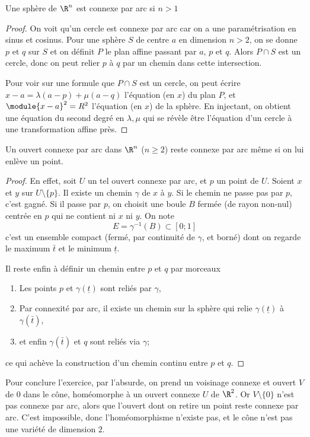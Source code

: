  \begin{lem}Une sphère de $\R^n$ est connexe par arc si $n >
   1$\end{lem}
 \begin{proof}On voit qu'un cercle est connexe par arc car on a une
   paramétrisation en sinus et cosinus. Pour une sphère $S$ de centre
   $a$ en dimension $n > 2$, on se donne $p$ et $q$ sur $S$ et on
   définit $P$ le plan affine passant par $a$, $p$ et $q$. Alors $P
   \cap S$ est un cercle, donc on peut relier $p$ à $q$ par un chemin
   dans cette intersection.

   Pour voir sur une formule que $P \cap S$ est un cercle, on peut
   écrire $x - a = \lambda(a-p) + \mu(a-q)$ l'équation (en $x$) du
   plan $P$, et $\module{x-a}^2 = R^2$ l'équation (en $x$) de la
   sphère. En injectant, on obtient une équation du second degré en
   $\lambda,\mu$ qui se révèle être l'équation d'un cercle à une
   transformation affine près.
 \end{proof}

 \begin{lem}Un ouvert connexe par arc dans $\R^n$ ($n \geq 2$) reste
   connexe par arc même si on lui enlève un point.\end{lem}
 \begin{proof}
   En effet, soit $U$ un tel ouvert connexe par arc, et $p$ un point
   de $U$. Soient $x$ et $y$ sur $U\setminus\{p\}$. Il existe un
   chemin $\gamma$ de $x$ à $y$. Si le chemin ne passe pas par $p$,
   c'est gagné. Si il passe par $p$, on choisit une boule $B$ fermée
   (de rayon non-nul) centrée en $p$ qui ne contient ni $x$ ni
   $y$. On note
   \[E = \gamma^{-1}(B) \subset [0;1]\] c'est un ensemble compact
   (fermé, par continuité de $\gamma$, et borné) dont on regarde le
   maximum $\bar t$ et le minimum $\underline t$.

   Il reste enfin à définir un chemin entre $p$ et $q$ par morceaux
   \begin{enumerate}
   \item Les points $p$ et $\gamma(\underline t)$ sont reliés par
     $\gamma$,
   \item Par connexité par arc, il existe un chemin sur la sphère qui
     relie $\gamma(\underline t)$ à $\gamma(\bar t)$,
   \item et enfin $\gamma(\bar t)$ et $q$ sont reliés via $\gamma$;
   \end{enumerate}
   ce qui achève la construction d'un chemin continu entre $p$ et
   $q$.
 \end{proof}
 Pour conclure l'exercice, par l'absurde, on prend un voisinage
 connexe et ouvert $V$ de $0$ dans le cône, homéomorphe à un ouvert
 connexe $U$ de $\R^2$. Or $V\setminus\{0\}$ n'est pas connexe par
 arc, alors que l'ouvert dont on retire un point reste connexe par
 arc. C'est impossible, donc l'homéomorphisme n'existe pas, et le
 cône n'est pas une variété de dimension $2$.
